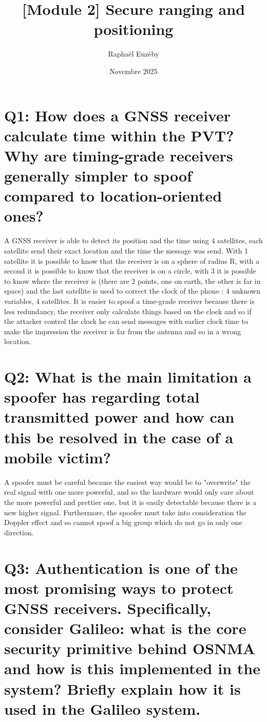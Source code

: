 \documentclass{article}
\title{[Module 2] Secure ranging and positioning}
\author{Raphaël Euzèby}
\date{Novembre 2025}
\begin{document}
\maketitle


\section*{
Q1: How does a GNSS receiver calculate time within the PVT? Why are timing-grade receivers generally simpler to spoof compared to location-oriented ones?
}

A GNSS receiver is able to detect its position and the time using 4 satellites, each satellite send their exact location and the time the message was send. With 1 satellite it is possible to know that the receiver is on a sphere of radius R, with a second it is possible to know that the receiver is on a circle, with 3 it is possible to know where the receiver is (there are 2 points, one on earth, the other is far in space) and the last satellite is used to correct the clock of the phone : 4 unknown variables, 4 satellites. 
It is easier to spoof a time-grade receiver because there is less redundancy, the receiver only calculate things based on the clock and so if the attacker control the clock he can send messages with earlier clock time to make the impression the receiver is far from the antenna and so in a wrong location.

\section*{
Q2: What is the main limitation a spoofer has regarding total transmitted power and how can this be resolved in the case of a mobile victim?
}
A spoofer must be careful because the easiest way would be to "overwrite" the real signal with one more powerful, and so the hardware would only care about the more powerful and prettier one, but it is easily detectable because there is a new higher signal.
Furthermore, the spoofer must take into consideration the Doppler effect and so cannot spoof a big group which do not go in only one direction.

\section*{
Q3: Authentication is one of the most promising ways to protect GNSS receivers. Specifically, consider Galileo: what is the core security primitive behind OSNMA and how is this implemented in the system? Briefly explain how it is used in the Galileo system.
}
\end{document}
